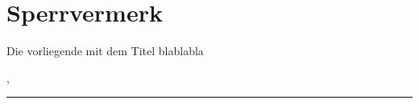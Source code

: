 \thispagestyle{empty}
\section*{Sperrvermerk}

\vspace*{2em}

Die vorliegende {\arbeit} mit dem Titel blablabla
\vspace{3em}

\abgabeort, \datumAbgabe
\vspace{4em}

\rule{6cm}{0.4pt}\\
\autor
